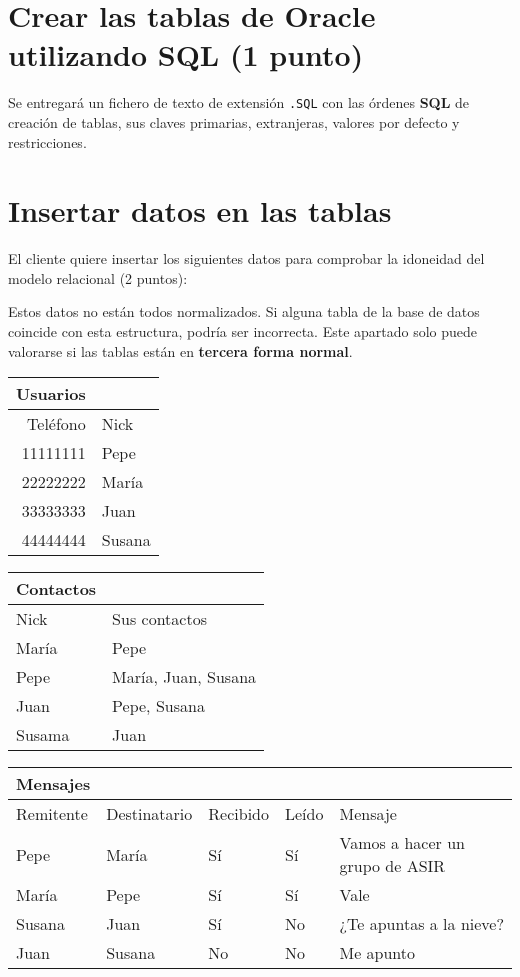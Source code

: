 \documentclass[a4paper]{article}
\begin{document}
\section{Crear las tablas de Oracle utilizando \textbf{SQL} (1 punto)}
\label{sec:org0000009}
Se entregará un fichero de texto de extensión \texttt{.SQL} con las órdenes \textbf{SQL} de creación de tablas, sus claves primarias, extranjeras, valores por defecto y restricciones.




\section{Insertar datos en las tablas}
\label{sec:org000000c}

El cliente quiere insertar los siguientes datos para comprobar la idoneidad del modelo relacional (2 puntos):

\begin{Aviso}
Estos datos no están todos normalizados. Si alguna tabla de la base de datos coincide con esta estructura, podría ser incorrecta.
Este apartado solo puede valorarse si las tablas están en \textbf{tercera forma normal}.
\end{Aviso}

\begin{center}
\begin{tabular}{|r|l|}
\hline
\textbf{Usuarios} & \\[0pt]
\hline
Teléfono & Nick\\[0pt]
\hline
11111111 & Pepe\\[0pt]
22222222 & María\\[0pt]
33333333 & Juan\\[0pt]
44444444 & Susana\\[0pt]
\hline
\end{tabular}
\begin{tabular}{|l|l|}
\hline
\textbf{Contactos} & \\[0pt]
\hline
Nick & Sus contactos\\[0pt]
\hline
María & Pepe\\[0pt]
Pepe & María, Juan, Susana\\[0pt]
Juan & Pepe, Susana\\[0pt]
Susama & Juan\\[0pt]
\hline
\end{tabular}
\end{center}

\begin{center}
\begin{tabular}{|l|l|l|l|l|}
\hline
\textbf{Mensajes} &  &  &  & \\[0pt]
\hline
Remitente & Destinatario & Recibido & Leído & Mensaje\\[0pt]
\hline
Pepe & María & Sí & Sí & Vamos a hacer un grupo de ASIR\\[0pt]
María & Pepe & Sí & Sí & Vale\\[0pt]
Susana & Juan & Sí & No & ¿Te apuntas a la nieve?\\[0pt]
Juan & Susana & No & No & Me apunto\\[0pt]
\hline
\end{tabular}
\end{center}
\end{document}
